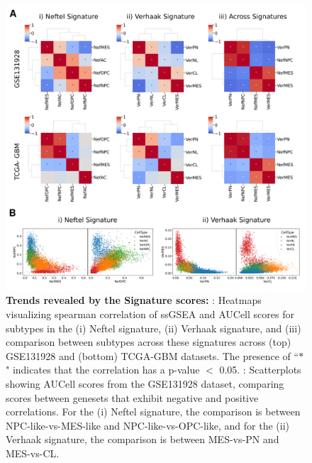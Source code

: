 \documentclass[11pt,a4paper]{article}
\begin{document}
\begin{figure}[h!]
    \begin{subfigure}[c]{\textwidth}
            \label{ssgseacorr}
        \end{subfigure}
        \begin{subfigure}[c]{\textwidth}
            \label{auscatter}
        \end{subfigure}
    \centering
    \includegraphics[width=\textwidth]{Figure2}
    \caption{\textbf{Trends revealed by the Signature scores:} : Heatmaps visualizing spearman correlation of ssGSEA and AUCell scores for subtypes in the (i) Neftel signature, (ii) Verhaak signature, and (iii) comparison between subtypes across these signatures across (top) GSE131928 and (bottom) TCGA-GBM  datasets. The presence of “$*$" indicates that the correlation has a p-value $<$ 0.05. : Scatterplots showing AUCell scores from the GSE131928 dataset, comparing scores between genesets that exhibit negative and positive correlations. For the (i) Neftel signature, the comparison is between NPC-like-vs-MES-like and NPC-like-vs-OPC-like, and for the (ii) Verhaak signature, the comparison is between MES-vs-PN and MES-vs-CL.}
    \label{ssgsea}
\end{figure}
\end{document}
